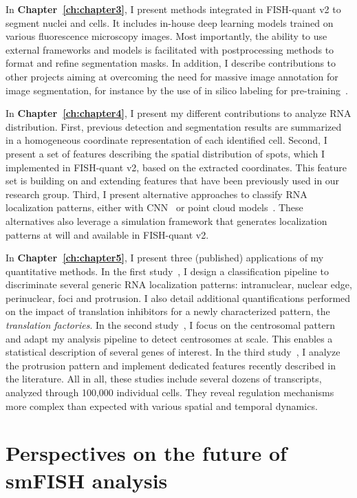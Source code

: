 In \textbf{Chapter~\ref{ch:chapter3}}, I present methods integrated in FISH-quant v2 to segment nuclei and cells.
It includes in-house deep learning models trained on various fluorescence microscopy images.
Most importantly, the ability to use external frameworks and models is facilitated with postprocessing methods to format and refine segmentation masks.
In addition, I describe contributions to other projects aiming at overcoming the need for massive image annotation for image segmentation, for instance by the use of in silico labeling for pre-training~\cite{Bonte_2022}.

In \textbf{Chapter~\ref{ch:chapter4}}, I present my different contributions to analyze \ac{RNA} distribution.
First, previous detection and segmentation results are summarized in a homogeneous coordinate representation of each identified cell.
Second, I present a set of features describing the spatial distribution of spots, which I implemented in FISH-quant v2, based on the extracted coordinates.
This feature set is building on and extending features that have been previously used in our research group.
Third, I present alternative approaches to classify \ac{RNA} localization patterns, either with \ac{CNN}~\cite{dubois_deep_2019} or point cloud models~\cite{pointfish_2022}.
These alternatives also leverage a simulation framework that generates localization patterns at will and available in FISH-quant v2.

In \textbf{Chapter~\ref{ch:chapter5}}, I present three (published) applications of my quantitative methods.
In the first study~\cite{CHOUAIB_2020}, I design a classification pipeline to discriminate several generic \ac{RNA} localization patterns: intranuclear, nuclear edge, perinuclear, foci and protrusion.
I also detail additional quantifications performed on the impact of translation inhibitors for a newly characterized pattern, the \emph{translation factories}.
In the second study~\cite{safieddine_choreography_2021}, I focus on the centrosomal pattern and adapt my analysis pipeline to detect centrosomes at scale.
This enables a statistical description of several genes of interest.
In the third study~\cite{pichon_kinesin_2021}, I analyze the protrusion pattern and implement dedicated features recently described in the literature.
All in all, these studies include several dozens of transcripts, analyzed through 100,000 individual cells.
They reveal regulation mechanisms more complex than expected with various spatial and temporal dynamics.

\section{Perspectives on the future of smFISH analysis}
\label{sec:conclusion_future}

